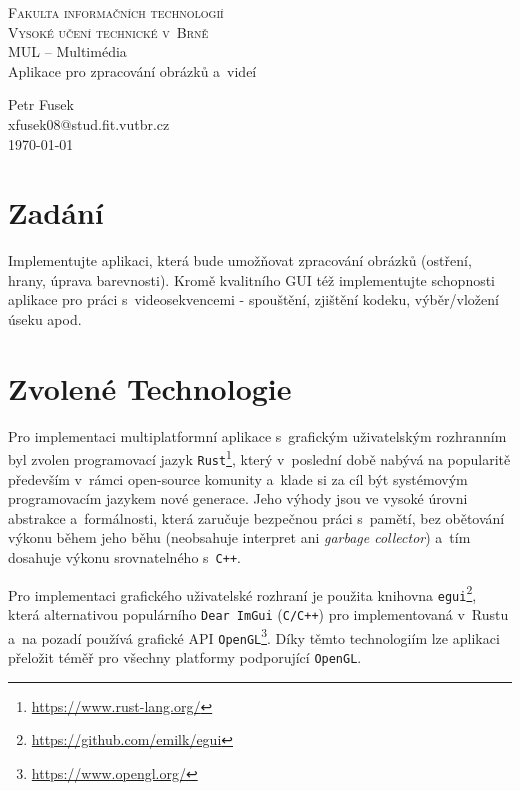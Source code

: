 \documentclass[11pt, a4paper, titlepage]{article}
\begin{document}
\begin{titlepage}
    \begin{center}
        \textsc{\LARGE Fakulta informačních technologií}\\
        \vspace{0.1 cm}
        \textsc{\LARGE Vysoké učení technické v~Brně}\\
        {\Huge MUL -- Multimédia}\\
        {\huge Aplikace pro zpracování obrázků a~videí}
    \end{center}
    \begin{center}
    \Large
    Petr Fusek \\
    xfusek08@stud.fit.vutbr.cz \\
    \today
    \end{center}
\end{titlepage}


\section{Zadání}
Implementujte aplikaci, která bude umožňovat zpracování obrázků (ostření, hrany, úprava barevnosti).
Kromě kvalitního GUI též implementujte schopnosti aplikace pro práci s~videosekvencemi - spouštění, zjištění kodeku, výběr/vložení úseku apod.

\section{Zvolené Technologie}
Pro implementaci multiplatformní aplikace s~grafickým uživatelským rozhranním byl zvolen programovací jazyk \texttt{Rust}\footnote{\url{https://www.rust-lang.org/}}, který v~poslední době nabývá na popularitě především v~rámci open-source komunity a~klade si za cíl být systémovým programovacím jazykem nové generace.
Jeho výhody jsou ve vysoké úrovni abstrakce a~formálnosti, která zaručuje bezpečnou práci s~pamětí, bez obětování výkonu během jeho běhu (neobsahuje interpret ani \emph{garbage collector}) a~tím dosahuje výkonu srovnatelného s~\texttt{C++}.

Pro implementaci grafického uživatelské rozhraní je použita knihovna \texttt{egui}\footnote{\url{https://github.com/emilk/egui}}, která alternativou populárního \texttt{Dear ImGui} (\texttt{C/C++}) pro implementovaná v~Rustu a~na pozadí používá grafické API \texttt{OpenGL}\footnote{\url{https://www.opengl.org/}}.
Díky těmto technologiím lze aplikaci přeložit téměř pro všechny platformy podporující \texttt{OpenGL}.
\end{document}
